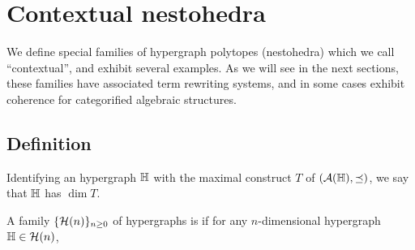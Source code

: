 
\section{Contextual nestohedra} 
\label{s:contextual}

We define special families of hypergraph polytopes (nestohedra) which we call ``contextual'', and exhibit several examples.
As we will see in the next sections, these families have associated term rewriting systems, and in some cases exhibit coherence for categorified algebraic structures.


\subsection{Definition}

Identifying an hypergraph ${\mathbb H}$ with the maximal construct $T$ of $({\cal A}({\mathbb H}),\preceq)$, we say that ${\mathbb H}$ has  $\dim T$.

\begin{definition}
    A family $\{\mathcal{H}(n)\}_{n\geq 0}$ of hypergraphs is  if for any $n$-dimensional hypergraph ${\mathbb H} \in \mathcal{H}(n)$, 
\end{definition}

